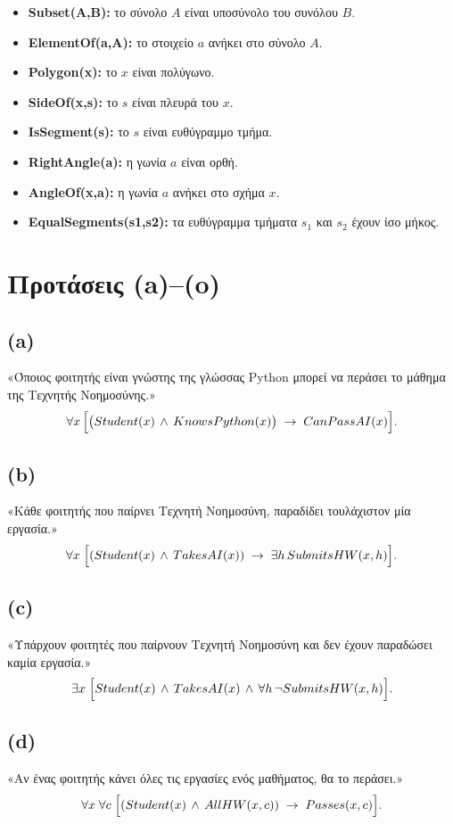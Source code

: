 \documentclass[a4paper,12pt]{article}
\begin{document}
\begin{itemize}
    \item \textbf{Subset(A,B):} το σύνολο \(A\) είναι υποσύνολο του συνόλου \(B\).
    \item \textbf{ElementOf(a,A):} το στοιχείο \(a\) ανήκει στο σύνολο \(A\).
    \item \textbf{Polygon(x):} το \(x\) είναι πολύγωνο.
    \item \textbf{SideOf(x,s):} το \(s\) είναι πλευρά του \(x\).
    \item \textbf{IsSegment(s):} το \(s\) είναι ευθύγραμμο τμήμα.
    \item \textbf{RightAngle(a):} η γωνία \(a\) είναι ορθή.
    \item \textbf{AngleOf(x,a):} η γωνία \(a\) ανήκει στο σχήμα \(x\).
    \item \textbf{EqualSegments(s1,s2):} τα ευθύγραμμα τμήματα \(s_1\) και \(s_2\) έχουν ίσο μήκος.
\end{itemize}

\section*{Προτάσεις (a)–(o)}

\subsection*{(a)}
«Όποιος φοιτητής είναι γνώστης της γλώσσας Python μπορεί να περάσει το μάθημα της Τεχνητής Νοημοσύνης.»
\[
\forall x\,\Bigl[\bigl(Student(x)\,\wedge\,KnowsPython(x)\bigr)\;\to\;CanPassAI(x)\Bigr].
\]

\subsection*{(b)}
«Κάθε φοιτητής που παίρνει Τεχνητή Νοημοσύνη, παραδίδει τουλάχιστον μία εργασία.»
\[
\forall x\;\Bigl[(Student(x)\,\wedge\,TakesAI(x)) \;\to\; \exists h\, SubmitsHW(x,h)\Bigr].
\]

\subsection*{(c)}
«Υπάρχουν φοιτητές που παίρνουν Τεχνητή Νοημοσύνη και δεν έχουν παραδώσει καμία εργασία.»
\[
\exists x\;\Bigl[Student(x)\,\wedge\,TakesAI(x)\,\wedge\,\forall h\,\neg SubmitsHW(x,h)\Bigr].
\]

\subsection*{(d)}
«Αν ένας φοιτητής κάνει όλες τις εργασίες ενός μαθήματος, θα το περάσει.»
\[
\forall x\;\forall c\;\Bigl[(Student(x)\,\wedge\,AllHW(x,c)) \;\to\; Passes(x,c)\Bigr].
\]
\end{document}
